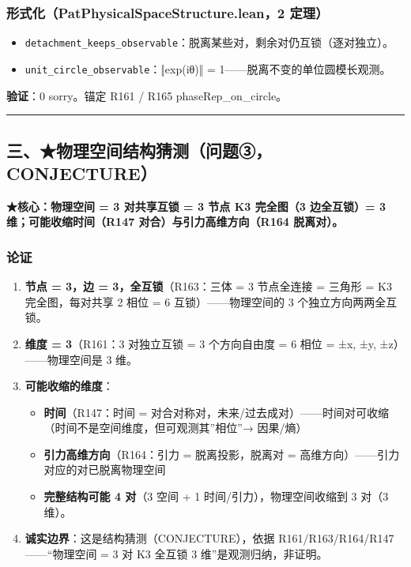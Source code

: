 \documentclass[
]{article}
\providecommand{\tightlist}{%
 \setlength{\itemsep}{0pt}\setlength{\parskip}{0pt}}
\begin{document}
\subsubsection{形式化（PatPhysicalSpaceStructure.lean，2
定理）}\label{ux5f62ux5f0fux5316patphysicalspacestructure.lean2-ux5b9aux7406}

\begin{itemize}
\tightlist
\item
 \texttt{detachment\_keeps\_observable}：脱离某些对，剩余对仍互锁（逐对独立）。
\item
 \texttt{unit\_circle\_observable}：‖exp(iθ)‖ =
 1------脱离不变的单位圆模长观测。
\end{itemize}

\textbf{验证}：0 sorry。锚定 R161 / R165 phaseRep\_on\_circle。

\begin{center}\rule{0.5\linewidth}{0.5pt}\end{center}

\subsection{三、★物理空间结构猜测（问题③，CONJECTURE）}\label{ux4e09ux7269ux7406ux7a7aux95f4ux7ed3ux6784ux731cux6d4bux95eeux9898ux2462conjecture}

\textbf{★核心：物理空间 = 3 对共享互锁 = 3 节点 K3 完全图（3 边全互锁）=
3 维；可能收缩时间（R147 对合）与引力高维方向（R164 脱离对）。}

\subsubsection{论证}\label{ux8bbaux8bc1-2}

\begin{enumerate}
\def\labelenumi{\arabic{enumi}.}
\tightlist
\item
 \textbf{节点 = 3，边 = 3，全互锁}（R163：三体 = 3 节点全连接 = 三角形
 = K3 完全图，每对共享 2 相位 = 6 互锁）------物理空间的 3
 个独立方向两两全互锁。
\item
 \textbf{维度 = 3}（R161：3 对独立互锁 = 3 个方向自由度 = 6 相位 = ±x,
 ±y, ±z）------物理空间是 3 维。
\item
 \textbf{可能收缩的维度}：

 \begin{itemize}
 \tightlist
 \item
 \textbf{时间}（R147：时间 =
 对合对称对，未来/过去成对）------时间对可收缩（时间不是空间维度，但可观测其''相位''→
 因果/熵）
 \item
 \textbf{引力高维方向}（R164：引力 = 脱离投影，脱离对 =
 高维方向）------引力对应的对已脱离物理空间
 \item
 \textbf{完整结构可能 4 对}（3 空间 + 1 时间/引力），物理空间收缩到 3
 对（3 维）。
 \end{itemize}
\item
 \textbf{诚实边界}：这是结构猜测（CONJECTURE），依据
 R161/R163/R164/R147------``物理空间 = 3 对 K3 全互锁 3
 维''是观测归纳，非证明。
\end{enumerate}
\end{document}
